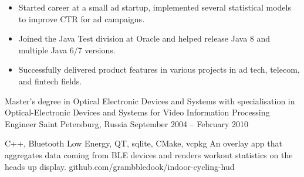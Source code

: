 \documentclass[a4paper,10pt]{article}
\begin{document}
    \begin{itemize}
        \item Started career at a small ad startup, implemented several statistical models to improve CTR for ad campaigns.
        \item Joined the Java Test division at Oracle and helped release Java 8 and multiple Java 6/7 versions.
        \item Successfully delivered product features in various projects in ad tech, telecom, and fintech fields.
    \end{itemize}


    {Master’s degree in Optical Electronic Devices and Systems with specialisation in Optical-Electronic Devices and Systems for Video Information Processing}
    {Engineer}
    {Saint Petersburg, Russia}
    {September 2004 -- February 2010}


    {C++, Bluetooth Low Energy, QT, sqlite, CMake, vcpkg}
    {An overlay app that aggregates data coming from BLE devices and renders workout statistics on the heads up display.}
    {github.com/grambbledook/indoor-cycling-hud}
%
%
\end{document}
